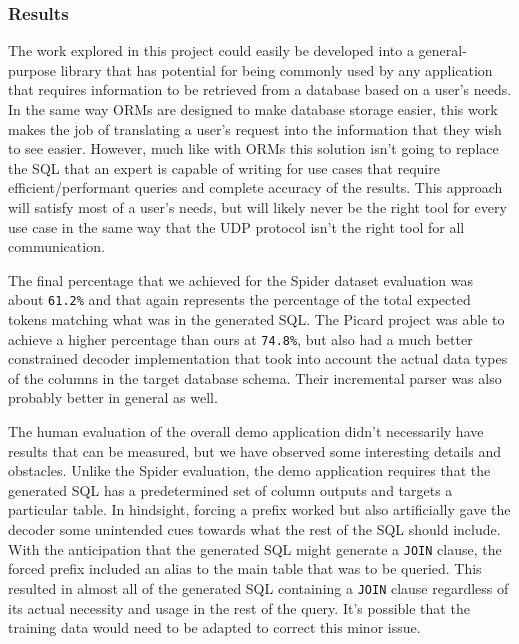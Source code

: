 \documentclass[11pt]{article}
\begin{document}
\subsubsection{Results}

The work explored in this project could easily be developed into a general-purpose library that has potential for being commonly used by any application that requires information to be retrieved from a database based on a user's needs. In the same way ORMs are designed to make database storage easier, this work makes the job of translating a user's request into the information that they wish to see easier. However, much like with ORMs this solution isn't going to replace the SQL that an expert is capable of writing for use cases that require efficient/performant queries and complete accuracy of the results. This approach will satisfy most of a user's needs, but will likely never be the right tool for every use case in the same way that the UDP protocol isn't the right tool for all communication.

The final percentage that we achieved for the Spider dataset evaluation was about \texttt{61.2\%} and that again represents the percentage of the total expected tokens matching what was in the generated SQL. The Picard project was able to achieve a higher percentage than ours at \texttt{74.8\%}, but also had a much better constrained decoder implementation that took into account the actual data types of the columns in the target database schema. Their incremental parser was also probably better in general as well.

The human evaluation of the overall demo application didn't necessarily have results that can be measured, but we have observed some interesting details and obstacles. Unlike the Spider evaluation, the demo application requires that the generated SQL has a predetermined set of column outputs and targets a particular table. In hindsight, forcing a prefix worked but also artificially gave the decoder some unintended cues towards what the rest of the SQL should include. With the anticipation that the generated SQL might generate a \texttt{JOIN} clause, the forced prefix included an alias to the main table that was to be queried. This resulted in almost all of the generated SQL containing a \texttt{JOIN} clause regardless of its actual necessity and usage in the rest of the query. It's possible that the training data would need to be adapted to correct this minor issue.
\end{document}
